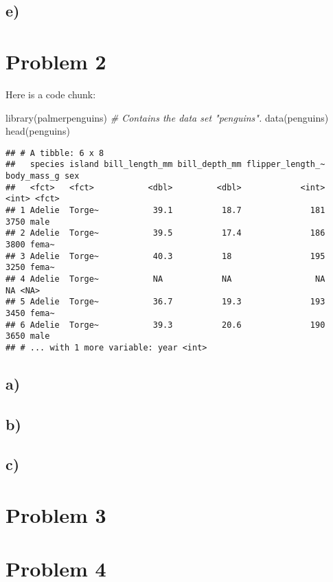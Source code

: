\documentclass[
]{article}
\newenvironment{Shaded}{\begin{snugshade}}{\end{snugshade}}
\newcommand{\CommentTok}[1]{\textcolor[rgb]{0.56,0.35,0.01}{\textit{#1}}}
\newcommand{\FunctionTok}[1]{\textcolor[rgb]{0.00,0.00,0.00}{#1}}
\newcommand{\NormalTok}[1]{#1}
\begin{document}
\hypertarget{e}{%
\subsection{e)}\label{e}}

\hypertarget{problem-2}{%
\section{Problem 2}\label{problem-2}}

Here is a code chunk:

\begin{Shaded}
\begin{Highlighting}[]
\FunctionTok{library}\NormalTok{(palmerpenguins) }\CommentTok{\# Contains the data set "penguins".}
\FunctionTok{data}\NormalTok{(penguins)}
\FunctionTok{head}\NormalTok{(penguins)}
\end{Highlighting}
\end{Shaded}

\begin{verbatim}
## # A tibble: 6 x 8
##   species island bill_length_mm bill_depth_mm flipper_length_~ body_mass_g sex  
##   <fct>   <fct>           <dbl>         <dbl>            <int>       <int> <fct>
## 1 Adelie  Torge~           39.1          18.7              181        3750 male 
## 2 Adelie  Torge~           39.5          17.4              186        3800 fema~
## 3 Adelie  Torge~           40.3          18                195        3250 fema~
## 4 Adelie  Torge~           NA            NA                 NA          NA <NA> 
## 5 Adelie  Torge~           36.7          19.3              193        3450 fema~
## 6 Adelie  Torge~           39.3          20.6              190        3650 male 
## # ... with 1 more variable: year <int>
\end{verbatim}

\hypertarget{a-1}{%
\subsection{a)}\label{a-1}}

\hypertarget{b-1}{%
\subsection{b)}\label{b-1}}

\hypertarget{c-1}{%
\subsection{c)}\label{c-1}}

\hypertarget{problem-3}{%
\section{Problem 3}\label{problem-3}}

\hypertarget{problem-4}{%
\section{Problem 4}\label{problem-4}}
\end{document}
